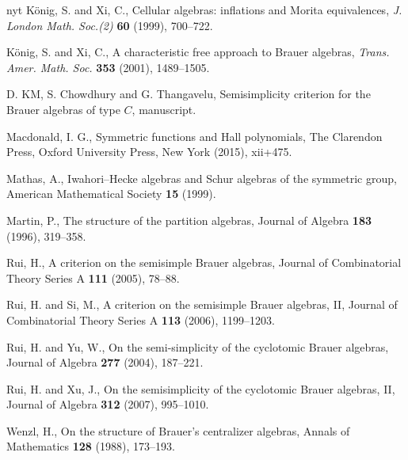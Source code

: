 \documentclass[10pt,a4paper]{amsart}
\newcommand{\1}{\mathfrak{1}}
\begin{document}
\begin{thebibliography}{nyt}
K{\"o}nig, S. and Xi, C., Cellular algebras: inflations and Morita equivalences, \textit{J. London Math. Soc.(2)} \textbf{60} (1999), 700--722.

K{\"o}nig, S. and Xi, C., A characteristic free approach to Brauer algebras, \textit{Trans. Amer. Math. Soc.} \textbf{353} (2001), 1489--1505.

D. KM, S. Chowdhury and G. Thangavelu,
Semisimplicity criterion for the Brauer algebras of type $C$,
manuscript.


Macdonald, I. G., Symmetric functions and Hall polynomials, {The Clarendon Press, Oxford University Press, New York} (2015), xii+475.

Mathas, A., Iwahori--Hecke algebras and Schur algebras of the symmetric group, {American Mathematical Society} {\bf 15} (1999).

Martin, P., The structure of the partition algebras, {Journal of Algebra} {\bf 183} (1996), 319--358.

Rui, H., A criterion on the semisimple Brauer algebras, {Journal of Combinatorial Theory Series A} {\bf 111} (2005), 78--88.

Rui, H. and Si, M., A criterion on the semisimple Brauer algebras, II, {Journal of Combinatorial Theory Series A} {\bf 113} (2006), 1199--1203.

Rui, H. and Yu, W., On the semi-simplicity of the cyclotomic Brauer algebras, {Journal of Algebra} {\bf 277} (2004), 187--221.

Rui, H. and Xu, J., On the semisimplicity of the cyclotomic Brauer algebras, II, {Journal of Algebra} {\bf 312} (2007), 995--1010.

Wenzl, H., On the structure of Brauer's centralizer algebras, {Annals of Mathematics} {\bf 128} (1988), 173--193.

\end{thebibliography}
\end{document}
